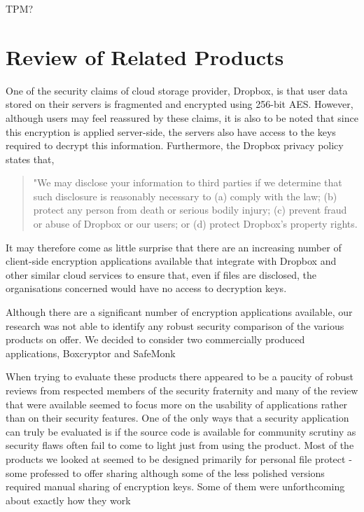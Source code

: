 TPM?
\section{Review of Related Products}

One of the security claims of cloud storage provider, Dropbox, is that user data stored on their servers is  fragmented and encrypted using 256-bit AES.  However, although users may feel reassured by these claims, it is also to be noted that since this encryption is applied server-side, the servers also have access to the keys required to decrypt this information.  Furthermore, the   Dropbox privacy policy states that,  
\begin{quotation}
"We may disclose your information to third parties if we determine that such disclosure is reasonably necessary to (a) comply with the law; (b) protect any person from death or serious bodily injury; (c) prevent fraud or abuse of Dropbox or our users; or (d) protect Dropbox's property rights. 
\end{quotation} 

It may therefore come as little surprise that there are an increasing  number of client-side encryption applications available that  integrate with Dropbox and other similar cloud services  to ensure that, even if files are disclosed, the organisations concerned would have no access to decryption keys.

Although there are a significant number of encryption applications available, our research was not able to identify any robust security comparison of the various products on offer.  We decided to consider two commercially produced applications, Boxcryptor and SafeMonk 

When trying to evaluate these products there appeared to be a paucity of robust reviews from respected members of the security fraternity and many of the review that were available seemed to focus more on the usability of applications rather than on their security features.  One of the only ways that a security application can truly be evaluated is if the source code is available for community scrutiny as security flaws often fail to come to light just from using the product.  Most of the products we looked at seemed to be designed primarily for personal file protect - some professed to offer sharing although some of the less polished versions required manual sharing of encryption keys.  Some of them were unforthcoming about exactly how they work

